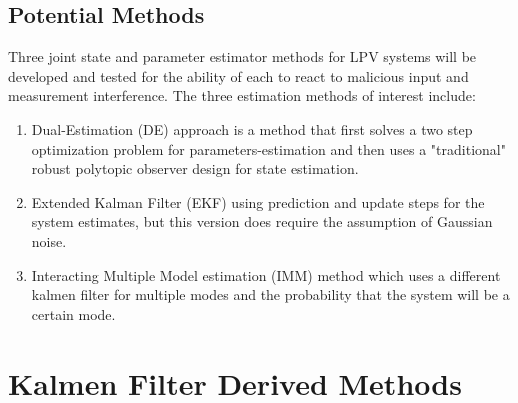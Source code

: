 \documentclass[]{ieeetran}
\begin{document}
\subsection{Potential Methods}
Three joint state and parameter estimator methods for LPV systems will be developed and tested for the ability of each to react to malicious input and measurement interference.
The three estimation methods of interest 
include:
\begin{enumerate}
	\item Dual-Estimation (DE) approach is a method that first solves a two step optimization problem for parameters-estimation and then uses a "traditional" robust polytopic observer design for state estimation. \cite{beelen2017joint}
	\item Extended Kalman Filter (EKF) using prediction and update steps for the system estimates, but this version does require the assumption of Gaussian noise. \cite{ekf_param_est}
	\item Interacting Multiple Model estimation (IMM) method which uses a different kalmen filter for multiple modes and the probability that the system will be a certain mode.\cite{bar2004estimation}
\end{enumerate}

\section{Kalmen Filter Derived Methods}
\end{document}
